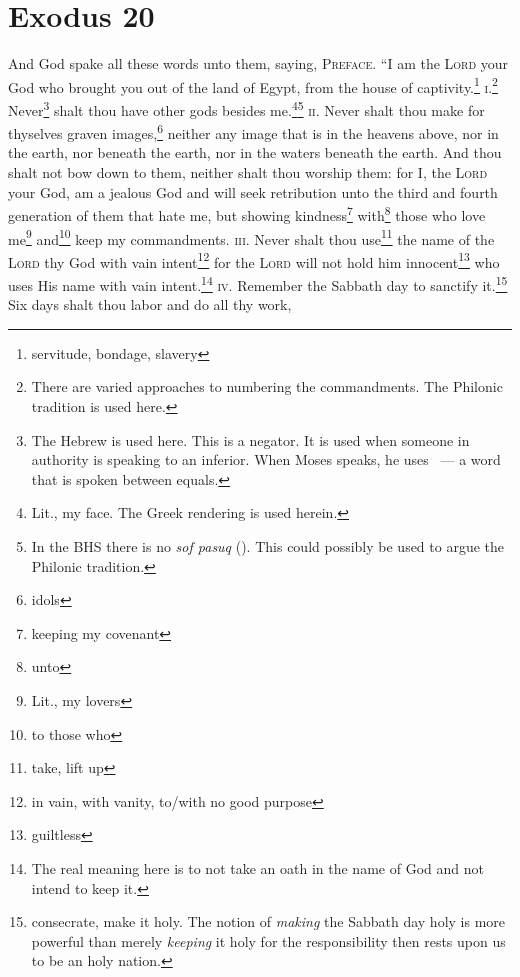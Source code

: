 \section{Exodus 20}\label{exodus:20}
\begin{enumerate}
     And God spake all these words unto them, saying,%
     \textsc{Preface.} ``I am the \textsc{Lord} your God who brought you out of the land of Egypt, from the house of captivity.\footnote{servitude, bondage, slavery}%
     \textsc{i.}\footnote{There are varied approaches to numbering the commandments. The Philonic tradition is used here.} Never\footnote{The Hebrew  is used here. This is a negator. It is used when someone in authority is speaking to an inferior. When Moses speaks, he uses ~--- a word that is spoken between equals.} shalt thou have other gods besides me.\footnote{Lit., my face. The Greek rendering is used herein.}\footnote{In the BHS there is no \emph{sof pasuq} (). This could possibly be used to argue the Philonic tradition.}%
     \textsc{ii.} Never shalt thou make for thyselves graven images,\footnote{idols} neither any image that is in the heavens above, nor in the earth, nor beneath the earth, nor in the waters beneath the earth.%
     And thou shalt not bow down to them, neither shalt thou worship them: for I, the \textsc{Lord} your God, am a jealous God and will seek retribution unto the third and fourth generation of them that hate me,%
     but showing kindness\footnote{keeping my covenant} with\footnote{unto} those who love me\footnote{Lit., my lovers} and\footnote{to those who} keep my commandments.%
     \textsc{iii.} Never shalt thou use\footnote{take, lift up} the name of the \textsc{Lord} thy God with vain intent\footnote{in vain, with vanity, to/with no good purpose} for the \textsc{Lord} will not hold him innocent\footnote{guiltless} who uses His name with vain intent.\footnote{The real meaning here is to not take an oath in the name of God and not intend to keep it.}%
     \textsc{iv.} Remember the Sabbath day to sanctify it.\footnote{consecrate, make it holy. The notion of \emph{making} the Sabbath day holy is more powerful than merely \emph{keeping} it holy for the responsibility then rests upon us to be an holy nation.}%
     Six days shalt thou labor and do all thy work,%

\end{enumerate}
